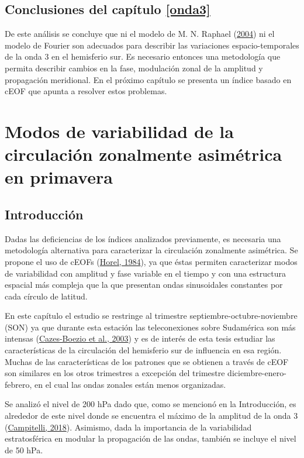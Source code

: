 \documentclass[12pt,oneside,a4paper]{reedthesis}
\begin{document}
\hypertarget{conclusiones-del-capuxedtulo-refonda3}{%
\section{Conclusiones del capítulo \ref{onda3}}\label{conclusiones-del-capuxedtulo-refonda3}}

De este análisis se concluye que ni el modelo de M. N. Raphael (\protect\hyperlink{ref-raphael2004}{2004}) ni el modelo de Fourier son adecuados para describir las variaciones espacio-temporales de la onda 3 en el hemisferio sur.
Es necesario entonces una metodología que permita describir cambios en la fase, modulación zonal de la amplitud y propagación meridional.
En el próximo capítulo se presenta un índice basado en cEOF que apunta a resolver estos problemas.

\hypertarget{ceofs}{%
\chapter{Modos de variabilidad de la circulación zonalmente asimétrica en primavera}\label{ceofs}}

\hypertarget{introducciuxf3n}{%
\section{Introducción}\label{introducciuxf3n}}

Dadas las deficiencias de los índices analizados previamente, es necesaria una metodología alternativa para caracterizar la circulación zonalmente asimétrica.
Se propone el uso de cEOFs (\protect\hyperlink{ref-horel1984}{Horel, 1984}), ya que éstas permiten caracterizar modos de variabilidad con amplitud y fase variable en el tiempo y con una estructura espacial más compleja que la que presentan ondas sinusoidales constantes por cada círculo de latitud.

En este capítulo el estudio se restringe al trimestre septiembre-octubre-noviembre (SON) ya que durante esta estación las teleconexiones sobre Sudamérica son más intensas (\protect\hyperlink{ref-cazes-boezio2003}{Cazes-Boezio et al., 2003}) y es de interés de esta tesis estudiar las características de la circulación del hemisferio sur de influencia en esa región.
Muchas de las características de los patrones que se obtienen a través de cEOF son similares en los otros trimestres a excepción del trimestre diciembre-enero-febrero, en el cual las ondas zonales están menos organizadas.

Se analizó el nivel de 200 hPa dado que, como se mencionó en la Introducción, es alrededor de este nivel donde se encuentra el máximo de la amplitud de la onda 3 (\protect\hyperlink{ref-campitelli2018b}{Campitelli, 2018}).
Asimismo, dada la importancia de la variabilidad estratosférica en modular la propagación de las ondas, también se incluye el nivel de 50 hPa.
\end{document}
